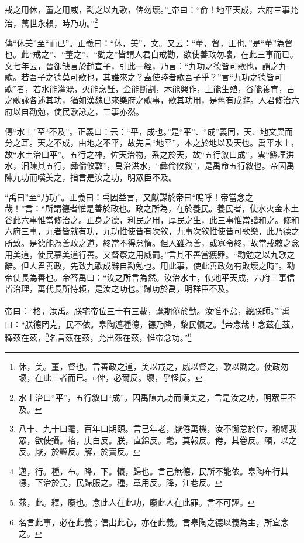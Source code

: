 戒之用休，董之用威，勸之以九歌，俾勿壞。”\footnote{休，美。董，督也。言善政之道，美以戒之，威以督之，歌以勸之。使政勿壞，在此三者而已。○俾，必爾反。壞，乎怪反。}帝曰：“俞！地平天成，六府三事允治，萬世永賴，時乃功。”\footnote{水土治曰“平”，五行敘曰“成”。因禹陳九功而嘆美之，言是汝之功，明眾臣不及。}

{\noindent\zhuan{}\fzbyks 傳“休美”至“而已”。正義曰：“休，美”，文。又云：“董，督，正也。”是“董”為督也。此“戒之”、“董之”、“勸之”皆謂人君自戒勸，欲使善政勿壞，在此三事而已。文七年云，晉卻缺言於趙宣子，引此一經，乃言：“九功之德皆可歌也，謂之九歌。若吾子之德莫可歌也，其誰來之？盍使睦者歌吾子乎？”言“九功之德皆可歌”者，若水能灌溉，火能烹飪，金能斷割，木能興作，土能生殖，谷能養育，古之歌詠各述其功，猶如漢魏已來樂府之歌事，歌其功用，是舊有成辭。人君修治六府以自勸勉，使民歌詠之，三事亦然。 \par}

{\noindent\zhuan{}\fzbyks 傳“水土”至“不及”。正義曰：云：“平，成也。”是“平”、“成”義同，天、地文異而分之耳。天之不成，由地之不平，故先言“地平”，本之於地以及天也。禹平水土，故“水土治曰平”。五行之神，佐天治物，系之於天，故“五行敘曰成”。雲“鯀堙洪水，汩陳其五行，彝倫攸斁”，禹治洪水，“彝倫攸敘”，是禹命五行敘也。帝因禹陳九功而嘆美之，指言是汝之功，明眾臣不及。 \par}

{\noindent\shu{}\fzkt “禹曰”至“乃功”。正義曰：禹因益言，又獻謀於帝曰“嗚呼！帝當念之哉！”言：“所謂德者惟是善於政也。政之所為，在於養民。養民者，使水火金木土谷此六事惟當修治之。正身之德，利民之用，厚民之生，此三事惟當諧和之。修和六府三事，九者皆就有功，九功惟使皆有次敘，九事次敘惟使皆可歌樂，此乃德之所致。是德能為善政之道，終當不得怠惰。但人雖為善，或寡令終，故當戒敕之念用美道，使民慕美道行善。又督察之用威罰。”言其不善當獲罪。“勸勉之以九歌之辭。但人君善政，先致九歌成辭自勸勉也。用此事，使此善政勿有敗壞之時”。勸帝使長為善也。帝答禹曰：“汝之所言為然。汝治水土，使地平天成，六府三事信皆治理，萬代長所恃賴，是汝之功也。”歸功於禹，明群臣不及。 \par}

帝曰：“格，汝禹。朕宅帝位三十有三載，耄期倦於勤。汝惟不怠，總朕師。”\footnote{八十、九十曰耄，百年曰期頤。言己年老，厭倦萬機，汝不懈怠於位，稱總我眾，欲使攝。格，庚白反。朕，直錦反。耄，莫報反。倦，其卷反。頤，以之反。厭，於豔反。解，於賣反。}禹曰：“朕德罔克，民不依。皋陶邁種德，德乃降，黎民懷之。\footnote{邁，行。種，布。降，下。懷，歸也。言己無德，民所不能依。皋陶布行其德，下治於民，民歸服之。種，章用反。降，江巷反。}帝念哉！念茲在茲，釋茲在茲，\footnote{茲，此。釋，廢也。念此人在此功，廢此人在此罪。言不可誣。}名言茲在茲，允出茲在茲，惟帝念功。”\footnote{名言此事，必在此義；信出此心，亦在此義。言皋陶之德以義為主，所宜念之。}

